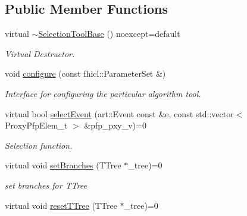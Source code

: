 \subsection*{Public Member Functions}
\begin{DoxyCompactItemize}
\item 
\hypertarget{classselection_1_1SelectionToolBase_a79885af9ff5ab77d239d8484c22ac87e}{virtual \hyperlink{classselection_1_1SelectionToolBase_a79885af9ff5ab77d239d8484c22ac87e}{$\sim$\-Selection\-Tool\-Base} () noexcept=default}\label{classselection_1_1SelectionToolBase_a79885af9ff5ab77d239d8484c22ac87e}

\begin{DoxyCompactList}\small\item\em Virtual Destructor. \end{DoxyCompactList}\item 
void \hyperlink{classselection_1_1SelectionToolBase_a36b68431bd5d3f815619d989faa7ef02}{configure} (const fhicl\-::\-Parameter\-Set \&)
\begin{DoxyCompactList}\small\item\em Interface for configuring the particular algorithm tool. \end{DoxyCompactList}\item 
virtual bool \hyperlink{classselection_1_1SelectionToolBase_ab63818dac49b43418fe9eb3b8cd98c9c}{select\-Event} (art\-::\-Event const \&e, const std\-::vector$<$ Proxy\-Pfp\-Elem\-\_\-t $>$ \&pfp\-\_\-pxy\-\_\-v)=0
\begin{DoxyCompactList}\small\item\em Selection function. \end{DoxyCompactList}\item 
\hypertarget{classselection_1_1SelectionToolBase_aa97ea5e55391240d8e251dae13897996}{virtual void \hyperlink{classselection_1_1SelectionToolBase_aa97ea5e55391240d8e251dae13897996}{set\-Branches} (T\-Tree $\ast$\-\_\-tree)=0}\label{classselection_1_1SelectionToolBase_aa97ea5e55391240d8e251dae13897996}

\begin{DoxyCompactList}\small\item\em set branches for T\-Tree \end{DoxyCompactList}\item 
\hypertarget{classselection_1_1SelectionToolBase_ae51d9c23ceee13bebf196d6535d5f1a5}{virtual void \hyperlink{classselection_1_1SelectionToolBase_ae51d9c23ceee13bebf196d6535d5f1a5}{reset\-T\-Tree} (T\-Tree $\ast$\-\_\-tree)=0}\label{classselection_1_1SelectionToolBase_ae51d9c23ceee13bebf196d6535d5f1a5}


\end{DoxyCompactItemize}
